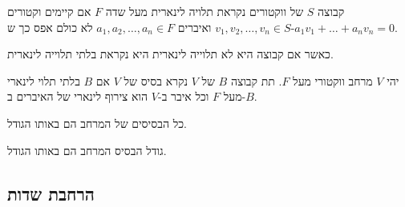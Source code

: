 \documentclass{tstextbook}
\begin{document}
\begin{definition}
קבוצה \(S\) של ווקטורים נקראת תלויה לינארית מעל שדה \(F\) אם קיימים וקטורים \(v_{1},v_{2},\dots,v_{n}\in S\) ואיברים \(a_{1},a_{2},\dots,a_{n}\in F\) לא כולם אפס כך ש-\(a_{1}v_{1}+\dots+a_{n}v_{n}=0\). 

\end{definition}
כאשר אם קבוצה היא לא תלוייה לינארית היא נקראת בלתי תלוייה לינארית.

\begin{definition}[בסיס]
יהי \(V\) מרחב ווקטורי מעל \(F\). תת קבוצה \(B\) של \(V\) נקרא בסיס של \(V\) אם \(B\) בלתי תלוי לינארי מעל \(F\) וכל איבר ב-\(V\) הוא צירוף לינארי של האיברים ב-\(B\).

\end{definition}
\begin{proposition}
כל הבסיסים של המרחב הם באותו הגודל.

\end{proposition}
\begin{definition}
גודל הבסיס המרחב הם באותו הגודל.

\end{definition}
\subsection{הרחבת שדות}
\end{document}
